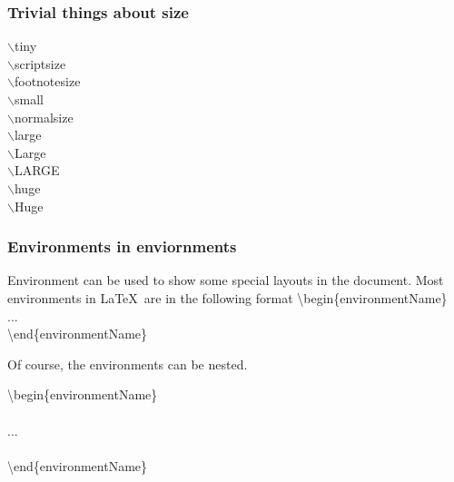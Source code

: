 \documentclass{beamer}
\begin{document}
\begin{frame}
	\frametitle{Trivial things about size}
    $\backslash$tiny 
    \\$\backslash$scriptsize 
    \\$\backslash$footnotesize 
    \\$\backslash$small 
    \vspace{3pt}
    \\$\backslash$normalsize  
    \vspace{3pt}
    \\$\backslash$large 
    \vspace{3pt}
    \\$\backslash$Large 
    \vspace{3pt}
    \\$\backslash$LARGE 
    \vspace{3pt}
    \\$\backslash$huge 
    \vspace{3pt}
    \\$\backslash$Huge 
\end{frame}
\begin{frame}
	\frametitle{Environments in enviornments}
	\begin{definition}
		Environment can be used to show some special layouts in the document. Most environments in \LaTeX\  are in the following format
		{\color{red}\textbackslash begin\{environmentName\}}\\
		\quad ...\\
		{\color{red}\textbackslash end\{environmentName\}}\\
	\end{definition}
	Of course, the environments can be nested.\\
	\begin{example}
		{\color{red}\textbackslash begin\{environmentName\}}\\
		\\
		\quad\quad ...\\
		\\
		{\color{red}\textbackslash end\{environmentName\}}\\
	\end{example}
\end{frame}
\end{document}
